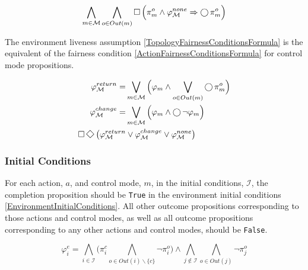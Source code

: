 \begin{equation}\label{TopologyOutcomePersistenceFormula}
	\bigwedge \limits_{m \in \mathcal{M}} \bigwedge \limits_{o \in Out(m)} \operatorname{\Box} \Big( \pi_m^o \wedge \varphi_\mathcal{M}^{none} \Rightarrow \operatorname{\bigcirc} \pi_m^o \Big)
\end{equation}

The environment liveness assumption \eqref{TopologyFairnessConditionsFormula} is the equivalent of the fairness condition \eqref{ActionFairnessConditionsFormula} for control mode propositions.

\begin{subequations}
	\begin{align}
		\varphi_\mathcal{M}^{return} = &\bigvee \limits_{m \in \mathcal{M}} \Big( \varphi_m \wedge \bigvee \limits_{o \in Out(m)} \LTLX \pi_m^o \Big)\label{TopologyFairnessConditionsFormula1}\\
		\varphi_\mathcal{M}^{change} = &\bigvee \limits_{m \in \mathcal{M}} \Big( \varphi_m \wedge \LTLX \lnot \varphi_m \Big)\label{TopologyFairnessConditionsFormula2}\\
		\LTLG \LTLF \big( \varphi_\mathcal{M}^{return} &\vee \varphi_\mathcal{M}^{change} \vee \varphi_\mathcal{M}^{none} \big)\label{TopologyFairnessConditionsFormula}
	\end{align}
\end{subequations}


\subsubsection{Initial Conditions}

For each action, $a$, and control mode, $m$, in the initial conditions, $\mathcal{I}$, the completion proposition should be \texttt{True} in the environment initial conditions \eqref{EnvironmentInitialConditions}.
All other outcome propositions corresponding to those actions and control modes, as well as all outcome propositions corresponding to any other actions and control modes, should be \texttt{False}.

\begin{equation}\label{EnvironmentInitialConditions}
	\varphi_i^e = \bigwedge \limits_{i \in \mathcal{I}} \Big( \pi_i^c \bigwedge \limits_{o \in Out(i)\backslash \{c\}} \lnot \pi_i^o \Big) \wedge \bigwedge \limits_{j \not\in \mathcal{I}} \bigwedge \limits_{o \in Out(j)} \lnot \pi_j^o
\end{equation}

